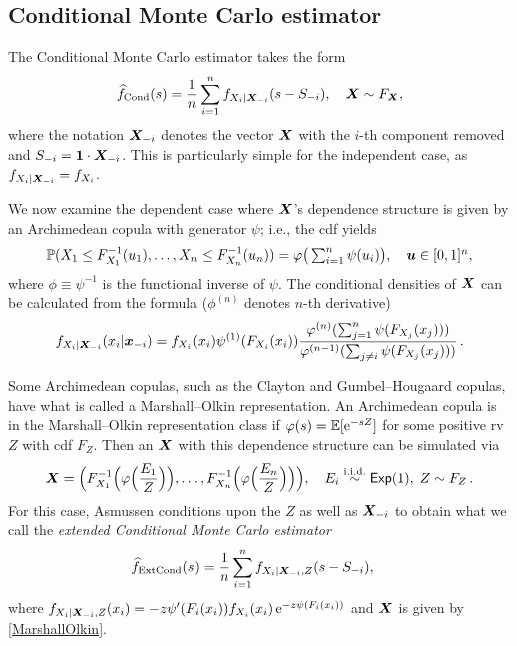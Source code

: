 \subsection{Conditional Monte Carlo estimator} \label{ssec:CondMC}

The Conditional Monte Carlo estimator \cite{asmussen2017conditional} takes the form
\[ \widehat{f}_{\mathrm{Cond}}(s) = \frac1n \sum_{i=1}^n f_{X_i | \boldsymbol{X}_{-i}}( s - S_{-i} ) , \quad \boldsymbol{X} \sim F_{\boldsymbol{X}},
 \]
where the notation $\boldsymbol{X}_{-i}$ denotes the vector $\boldsymbol{X}$ with the $i$-th component removed and $S_{-i}=\boldsymbol{1} \cdot \boldsymbol{X}_{-i}$. This is particularly simple for the independent case, as $f_{X_i | \boldsymbol{X}_{-i}} = f_{X_i}$.

We now examine the dependent case where $\boldsymbol{X}$'s dependence structure is given by an Archimedean copula with generator $\psi$; i.e., the cdf yields
\begin{equation*}  
\textstyle
\operatorname{{\mathbb P}}(X_1\le F_{X_1}^{-1}(u_1), \dots, X_n \le F_{X_n}^{-1}(u_n)) =\varphi\big( \sum_{i=1}^n \psi(u_i) \big),\quad \boldsymbol{u}\in[0,1]^n,
\end{equation*}
where $\phi\equiv \psi^{-1}$ is the functional inverse of $\psi$.
 The  conditional densities of $\boldsymbol{X}$ can be calculated from the formula 
($\phi^{(n)}$ denotes $n$-th derivative)
\begin{equation} \label{GenCondMC}
f_{X_i | \boldsymbol{X}_{-i}}(x_i | \boldsymbol{x}_{-i}) = f_{X_i}(x_i) \psi^{(1)}( F_{X_i}(x_i)) \frac{\varphi^{(n)}( \sum_{j=1}^n \psi(F_{X_j}(x_j)) ) }{\varphi^{(n-1)}( \sum_{j\not=i} \psi(F_{X_j}(x_j)))} \,.
\end{equation}

Some Archimedean copulas, such as the Clayton and Gumbel--Hougaard copulas, have what is called a Marshall--Olkin representation. An Archimedean copula is in the Marshall--Olkin representation class if  $\varphi(s) = \operatorname{{\mathbb E}}[\mathrm{e}^{-s Z}]$ for some positive rv $Z$ with cdf $F_Z$. Then an $\boldsymbol{X}$ with this dependence structure can be simulated via
\begin{equation} \label{MarshallOlkin} \boldsymbol{X} = \Big(F_{X_1}^{-1}\Big( \varphi\Big(\frac{E_1}{Z}\Big) \Big), \dots, F_{X_n}^{-1}\Big( \varphi\Big(\frac{E_n}{Z}\Big) \Big) \Big) , \quad E_i \overset{\mathrm{i.i.d.}}{\sim} \mathsf{Exp}(1),\; Z \sim F_Z \,.
\end{equation}
For this case, Asmussen \cite[Proposition~8.3]{asmussen2017conditional} conditions upon the $Z$ as well as $\boldsymbol{X}_{-i}$ to obtain what we call the \emph{extended Conditional Monte Carlo estimator}
\begin{align} \label{ExtCondMC}
 \widehat{f}_{\mathrm{ExtCond}}(s) &= \frac{1}{n}\sum_{i=1}^n f_{X_i | \boldsymbol{X}_{-i}, Z}( s - S_{-i} ),  
\end{align}
where $f_{X_i | \boldsymbol{X}_{-i}, Z}(x_i ) = -z \psi'(F_i( x_i )) f_{X_i}( x_i ) \, \mathrm{e}^{ -z \psi(F_i( x_i )) }$ and  $\boldsymbol{X}$ is given by \eqref{MarshallOlkin}.


